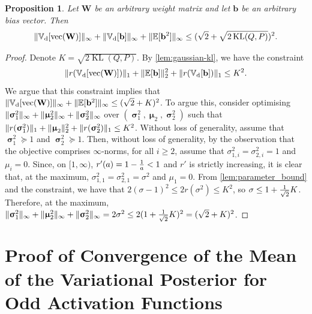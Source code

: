 \documentclass[twoside]{article}
\renewcommand{\ss}[1]{_{\text{#1}}}
\newcommand{\vb}{\mathbf{b}}
\newcommand{\vmu}{\bm{\upmu}}
\newcommand{\vsigma}{\bm{\upsigma}}
\newcommand{\mW}{\mathbf{W}}
\newcommand{\E}{\mathbb{E}}
\newcommand{\V}{\mathbb{V}}
\newcommand{\KL}{\operatorname{KL}}
\renewcommand{\ss}[1]{_{\text{#1}}}        %
\DeclarePairedDelimiter\norm{\|}{\|}             %
\theoremstyle{theoremstyle}
\newtheorem{proposition}[theorem]{Proposition}
\begin{document}
\begin{proposition} \label{prop:optimised_param_bound}
    Let $\mW$ be an arbitrary weight matrix and let $\vb$ be an arbitrary bias vector.
    Then
    \begin{equation}
        \norm{\V\ss{d}[\operatorname{vec}(\mW)]}_\infty
        + \norm{\V\ss{d}[\vb]}_\infty
        + \norm{\E[\vb^2]}_\infty
        \le (\sqrt{2} + \sqrt{2\KL(Q, P)})^2.
    \end{equation}
\end{proposition}
\begin{proof}
    Denote $K = \sqrt{2\KL(Q, P)}$.
    By \cref{lem:gaussian-kl}, we have the constraint
    \begin{equation}
        \norm{r(\V\ss{d}[\operatorname{vec}(\mW)])}_1
        + \norm{\E[\vb]}_2^2
        + \norm{r(\V\ss{d}[\vb])}_1
        \le K^2.
    \end{equation}
    We argue that this constraint implies that $
        \norm{\V\ss{d}[\operatorname{vec}(\mW)]}_\infty
        + \norm{\E[\vb^2]}_\infty
    \le (\sqrt{2} + K)^2$.
    To argue this, consider optimising $\norm{\vsigma^2_1}_\infty + \norm{\vmu_2^2}_\infty + \norm{\vsigma_2^2}_\infty$ over $(\vsigma_1^2, \vmu_2, \vsigma_2^2)$ such that $\norm{r(\vsigma_1^2)}_1 + \norm{\vmu_2}_2^2 + \norm{r(\vsigma_2^2)}_1 \le K^2$.
    Without loss of generality, assume that $\vsigma_1^2 \succeq 1$ and $\vsigma_2^2 \succeq 1$.
    Then, without loss of generality, by the observation that the objective comprises $\infty$-norms, for all $i \ge 2$, assume that $\sigma_{1,i}^2=\sigma_{2,i}^2=1$ and $\mu_{i} = 0$.
    Since, on $[1, \infty)$, $r'(a) = 1 - \smash{\tfrac1a} < 1$ and $r'$ is strictly increasing, it is clear that, at the maximum, $\sigma_{1,1}^2 = \sigma_{2,1}^2 = \sigma^2$ and $\mu_1 = 0$.
    From \cref{lem:parameter_bound} and the constraint, we have that $2 (\sigma - 1)^2 \le 2 r(\sigma^2) \le K^2$, so $\sigma \le 1 + \smash{\tfrac1{\sqrt{2}}} K$.
    Therefore, at the maximum, $\norm{\vsigma^2_1}_\infty + \norm{\vmu_2^2}_\infty + \norm{\vsigma_2^2}_\infty = 2 \sigma^2 \le 2 (1 + \smash{\tfrac1{\sqrt{2}}} K)^2 = (\sqrt{2} + K)^2$.
\end{proof}

\section{Proof of Convergence of the Mean of the Variational Posterior for Odd Activation Functions}\label{app:mean-convergence}
\end{document}
